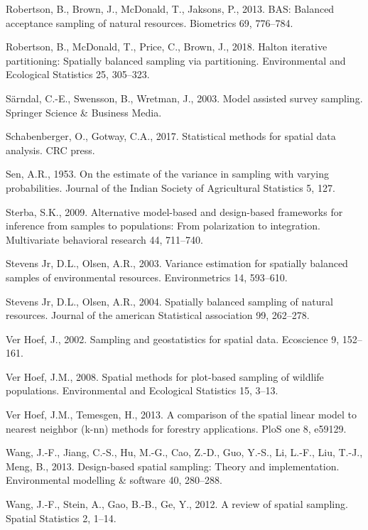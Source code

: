 \documentclass[]{elsarticle} %
\begin{document}
\leavevmode\hypertarget{ref-robertson2013bas}{}%
Robertson, B., Brown, J., McDonald, T., Jaksons, P., 2013. BAS: Balanced
acceptance sampling of natural resources. Biometrics 69, 776--784.

\leavevmode\hypertarget{ref-robertson2018halton}{}%
Robertson, B., McDonald, T., Price, C., Brown, J., 2018. Halton
iterative partitioning: Spatially balanced sampling via partitioning.
Environmental and Ecological Statistics 25, 305--323.

\leavevmode\hypertarget{ref-sarndal2003model}{}%
Särndal, C.-E., Swensson, B., Wretman, J., 2003. Model assisted survey
sampling. Springer Science \& Business Media.

\leavevmode\hypertarget{ref-schabenberger2017statistical}{}%
Schabenberger, O., Gotway, C.A., 2017. Statistical methods for spatial
data analysis. CRC press.

\leavevmode\hypertarget{ref-sen1953estimate}{}%
Sen, A.R., 1953. On the estimate of the variance in sampling with
varying probabilities. Journal of the Indian Society of Agricultural
Statistics 5, 127.

\leavevmode\hypertarget{ref-sterba2009alternative}{}%
Sterba, S.K., 2009. Alternative model-based and design-based frameworks
for inference from samples to populations: From polarization to
integration. Multivariate behavioral research 44, 711--740.

\leavevmode\hypertarget{ref-stevens2003variance}{}%
Stevens Jr, D.L., Olsen, A.R., 2003. Variance estimation for spatially
balanced samples of environmental resources. Environmetrics 14,
593--610.

\leavevmode\hypertarget{ref-stevens2004spatially}{}%
Stevens Jr, D.L., Olsen, A.R., 2004. Spatially balanced sampling of
natural resources. Journal of the american Statistical association 99,
262--278.

\leavevmode\hypertarget{ref-verhoef2002sampling}{}%
Ver Hoef, J., 2002. Sampling and geostatistics for spatial data.
Ecoscience 9, 152--161.

\leavevmode\hypertarget{ref-verhoef2008spatial}{}%
Ver Hoef, J.M., 2008. Spatial methods for plot-based sampling of
wildlife populations. Environmental and Ecological Statistics 15, 3--13.

\leavevmode\hypertarget{ref-ver2013comparison}{}%
Ver Hoef, J.M., Temesgen, H., 2013. A comparison of the spatial linear
model to nearest neighbor (k-nn) methods for forestry applications. PloS
one 8, e59129.

\leavevmode\hypertarget{ref-wang2013design}{}%
Wang, J.-F., Jiang, C.-S., Hu, M.-G., Cao, Z.-D., Guo, Y.-S., Li, L.-F.,
Liu, T.-J., Meng, B., 2013. Design-based spatial sampling: Theory and
implementation. Environmental modelling \& software 40, 280--288.

\leavevmode\hypertarget{ref-wang2012review}{}%
Wang, J.-F., Stein, A., Gao, B.-B., Ge, Y., 2012. A review of spatial
sampling. Spatial Statistics 2, 1--14.
\end{document}
